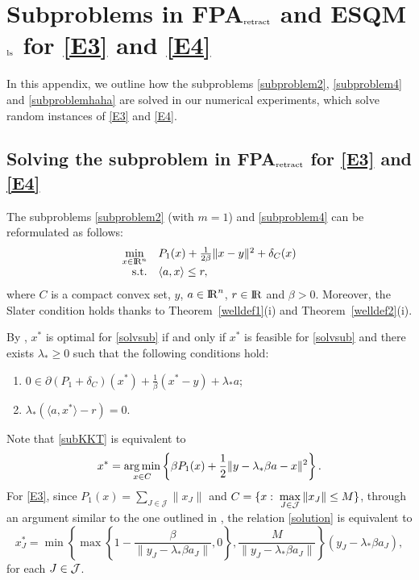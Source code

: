 \documentclass[10pt]{article}
\numberwithin{equation}{section}
\def\R{{\rm I\!R}}
\def\argmin{\mathop{\rm arg\,min}}
\begin{document}
\appendix

\section{Subproblems in FPA$_{\rm retract}$ and ESQM$_{\rm ls}$ for \eqref{E3} and \eqref{E4}}

In this appendix, we outline how the subproblems \eqref{subproblem2}, \eqref{subproblem4} and \eqref{subproblemhaha} are solved in our numerical experiments, which solve random instances of \eqref{E3} and \eqref{E4}.

\subsection{Solving the subproblem in FPA$_{\rm retract}$ for \eqref{E3} and \eqref{E4} }\label{sec:append1}
The subproblems \eqref{subproblem2} (with $m = 1$) and \eqref{subproblem4} can be reformulated as follows:
\begin{equation}\label{solvsub}
  \begin{array}{rl}
\min\limits_{x\in\R^n} & P_1(x) + \frac{1}{2\beta}\|x - y\|^2 + \delta_{C}(x)\\
{\rm s.t.} & \langle a, x\rangle\leq r,
  \end{array}
\end{equation}
where $C$ is a compact convex set, $y$, $a\in\R^n$, $r\in \R$ and $\beta >0$. Moreover, the Slater condition holds thanks to Theorem~\ref{welldef1}(i) and Theorem~\ref{welldef2}(i).

By \cite[Corollary~28.2.1, Theorem~28.3]{Ro70}, $x^*$ is optimal for \eqref{solvsub} if and only if $x^*$ is feasible {\color{blue} for \eqref{solvsub}} and there exists $\lambda_*\ge 0$ such that the following conditions hold:
\begin{enumerate}[{\rm (I)}]
  \item\label{subKKT}  $0\in\partial (P_1 + \delta_{C})(x^*) + \frac{1}{\beta}(x^* - y) + \lambda_*a $;
  \item\label{subKKT2}  $\lambda_*(\langle a, x^*\rangle - r)=0$.
\end{enumerate}
Note that \eqref{subKKT} is equivalent to
\begin{equation}\label{solution}
x^* = \argmin_{x\in C}\left\{\beta P_1(x) + \frac12\|y - \lambda_*\beta a - x\|^2\right\}.
\end{equation}
For \eqref{E3}, since $P_1(x) = \sum\limits_{J\in\mathcal{J}}\|x_J\|$ and $C = \{x:\; \max\limits_{J\in {\cal J}}\|x_J\|\leq M\}$, through an argument similar to the one outlined in \cite[Appendix]{LiuPo17}, the relation \eqref{solution} is equivalent to
\begin{equation}\label{solution1}
x^*_J = \min\left\{\max\left\{1 - \frac{\beta}{\|y_J - \lambda_*\beta a_J\|}, 0\right\},\frac{M}{\|y_J - \lambda_*\beta a_J\|}\right\}(y_J - \lambda_*\beta a_J),
\end{equation}
for each $J \in {\cal J}$.
\end{document}
